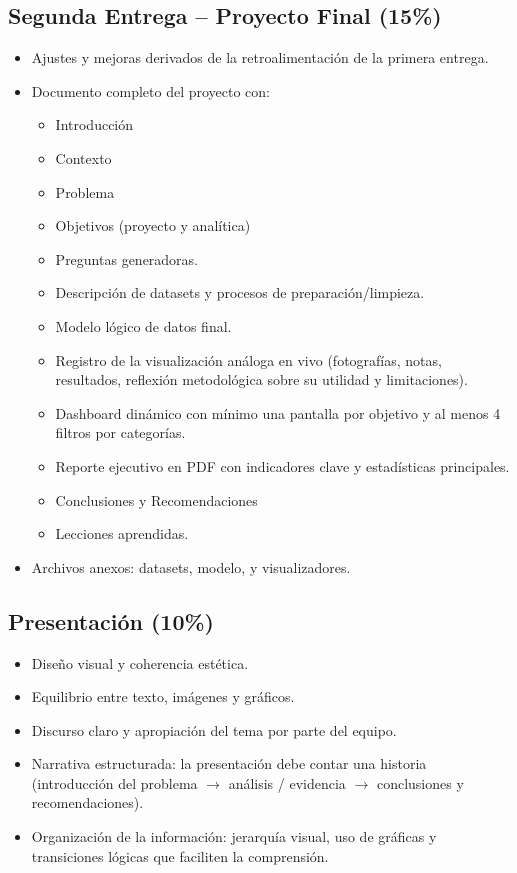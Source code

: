 \documentclass[12pt, spanish]{article}
\begin{document}
\subsection*{Segunda Entrega – Proyecto Final (15\%)}
\begin{itemize}
    \item Ajustes y mejoras derivados de la retroalimentación de la primera entrega.
    \item Documento completo del proyecto con:
    \begin{itemize}
        \item Introducción
        \item Contexto
        \item Problema
        \item Objetivos (proyecto y analítica)
        \item Preguntas generadoras.
        \item Descripción de datasets y procesos de preparación/limpieza.
        \item Modelo lógico de datos final.
        \item Registro de la visualización análoga en vivo (fotografías, notas, resultados, reflexión metodológica sobre su utilidad y limitaciones).
        \item Dashboard dinámico con mínimo una pantalla por objetivo y al menos 4 filtros por categorías.
        \item Reporte ejecutivo en PDF con indicadores clave y estadísticas principales.
        \item Conclusiones y Recomendaciones
        \item Lecciones aprendidas.
    \end{itemize}
    \item Archivos anexos: datasets, modelo, y visualizadores.
\end{itemize}

\subsection*{Presentación (10\%)}
\begin{itemize}
    \item Diseño visual y coherencia estética.
    \item Equilibrio entre texto, imágenes y gráficos.
    \item Discurso claro y apropiación del tema por parte del equipo.
    \item Narrativa estructurada: la presentación debe contar una historia (introducción del problema $\rightarrow$ análisis / evidencia $\rightarrow$ conclusiones y recomendaciones).
    \item Organización de la información: jerarquía visual, uso de gráficas y transiciones lógicas que faciliten la comprensión.
\end{itemize}
\end{document}
